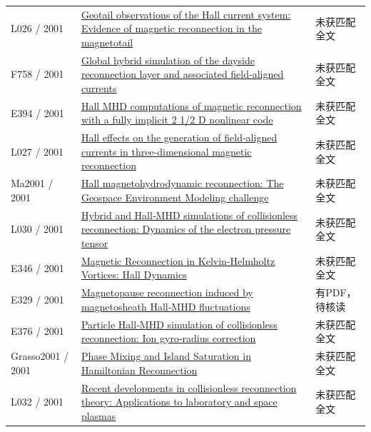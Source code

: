 \documentclass[UTF8,a4paper,11pt,openany,fontset=fandol]{ctexbook}
\begin{document}
\begin{longtable}{P{24mm}P{97mm}P{27mm}}
L026 / 2001 & \href{https://doi.org/10.1029/2001ja900038}{Geotail observations of the Hall current system: Evidence of magnetic reconnection in the magnetotail} & 未获匹配全文\\

F758 / 2001 & \href{https://doi.org/10.1029/2000ja000184}{Global hybrid simulation of the dayside reconnection layer and associated field‐aligned currents} & 未获匹配全文\\

E394 / 2001 & \href{http://ui.adsabs.harvard.edu/abs/2001AGUSM..SM31A06F/abstract}{Hall MHD computations of magnetic reconnection with a fully implicit 2 1/2 D nonlinear code} & 未获匹配全文\\

L027 / 2001 & \href{https://doi.org/10.1029/2000ja000290}{Hall effects on the generation of field‐aligned currents in three‐dimensional magnetic reconnection} & 未获匹配全文\\

Ma2001 / 2001 & \href{https://doi.org/10.1029/1999ja001004}{Hall magnetohydrodynamic reconnection: The Geospace Environment Modeling challenge} & 未获匹配全文\\

L030 / 2001 & \href{https://doi.org/10.1029/2000ja000398}{Hybrid and Hall‐MHD simulations of collisionless reconnection: Dynamics of the electron pressure tensor} & 未获匹配全文\\

E346 / 2001 & \href{http://ui.adsabs.harvard.edu/abs/2001AGUFMSM41B0811N/abstract}{Magnetic Reconnection in Kelvin-Helmholtz Vortices: Hall Dynamics} & 未获匹配全文\\

E329 / 2001 & \href{https://doi.org/10.1029/2000ja900151}{Magnetopause reconnection induced by magnetosheath Hall‐MHD fluctuations} & 有PDF，待核读\\

E376 / 2001 & \href{https://doi.org/10.1029/2000gl012797}{Particle Hall‐MHD simulation of collisionless reconnection: Ion gyro‐radius correction} & 未获匹配全文\\

Grasso2001 / 2001 & \href{https://doi.org/10.1103/physrevlett.86.5051}{Phase Mixing and Island Saturation in Hamiltonian Reconnection} & 未获匹配全文\\

L032 / 2001 & \href{https://doi.org/10.1063/1.1353803}{Recent developments in collisionless reconnection theory: Applications to laboratory and space plasmas} & 未获匹配全文\\


\end{longtable}
\end{document}
